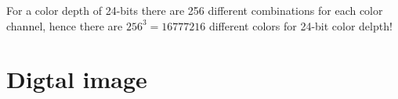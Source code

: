 For a color depth of 24-bits there are 256 different combinations for
each color channel, hence there are $256^3 = 16777216$ different
colors for 24-bit color delpth! %


\section{Digtal image}
\label{sec:digtal-image}

\cite{ohlsson99:_digit_bild_kreat}



\printbibliography[heading=subbibliography]
